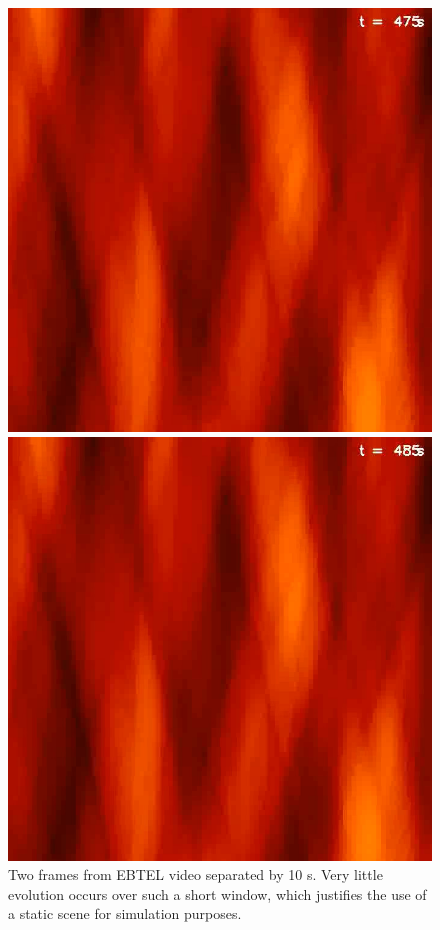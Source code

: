 \documentclass[tocnosub,noragright,centerchapter,12pt]{uiucecethesis09}
\begin{document}
\begin{figure}
  \centering
  \begin{minipage}{.5\textwidth}
    \centering
    \includegraphics[width=.8\linewidth]{figures/strands_klimchuk.png}
  \end{minipage}%
  \begin{minipage}{.5\textwidth}
    \centering
    \includegraphics[width=.8\linewidth]{figures/strands_klimchuk2.png}
  \end{minipage}
  \caption{Two frames from EBTEL video separated by 10 s.  Very little evolution occurs over such a short window, which justifies the use of a static scene for simulation purposes.}
  \label{fig:strands_static}
\end{figure}
\end{document}
